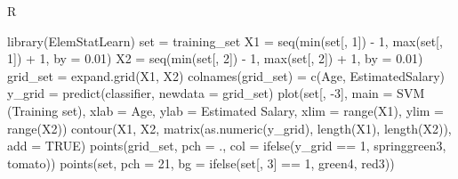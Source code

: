 \documentclass[
]{book}
\newenvironment{Shaded}{\begin{snugshade}}{\end{snugshade}}
\newcommand{\AttributeTok}[1]{\textcolor[rgb]{0.77,0.63,0.00}{#1}}
\newcommand{\ConstantTok}[1]{\textcolor[rgb]{0.00,0.00,0.00}{#1}}
\newcommand{\DecValTok}[1]{\textcolor[rgb]{0.00,0.00,0.81}{#1}}
\newcommand{\FloatTok}[1]{\textcolor[rgb]{0.00,0.00,0.81}{#1}}
\newcommand{\FunctionTok}[1]{\textcolor[rgb]{0.00,0.00,0.00}{#1}}
\newcommand{\NormalTok}[1]{#1}
\newcommand{\OtherTok}[1]{\textcolor[rgb]{0.56,0.35,0.01}{#1}}
\newcommand{\SpecialCharTok}[1]{\textcolor[rgb]{0.00,0.00,0.00}{#1}}
\newcommand{\StringTok}[1]{\textcolor[rgb]{0.31,0.60,0.02}{#1}}
\theoremstyle{definition}
\theoremstyle{definition}
\theoremstyle{definition}
\theoremstyle{definition}
\theoremstyle{remark}
\begin{document}
R

\begin{Shaded}
\begin{Highlighting}[]
\FunctionTok{library}\NormalTok{(ElemStatLearn)}
\NormalTok{set }\OtherTok{=}\NormalTok{ training\_set}
\NormalTok{X1 }\OtherTok{=} \FunctionTok{seq}\NormalTok{(}\FunctionTok{min}\NormalTok{(set[, }\DecValTok{1}\NormalTok{]) }\SpecialCharTok{{-}} \DecValTok{1}\NormalTok{, }\FunctionTok{max}\NormalTok{(set[, }\DecValTok{1}\NormalTok{]) }\SpecialCharTok{+} \DecValTok{1}\NormalTok{, }\AttributeTok{by =} \FloatTok{0.01}\NormalTok{)}
\NormalTok{X2 }\OtherTok{=} \FunctionTok{seq}\NormalTok{(}\FunctionTok{min}\NormalTok{(set[, }\DecValTok{2}\NormalTok{]) }\SpecialCharTok{{-}} \DecValTok{1}\NormalTok{, }\FunctionTok{max}\NormalTok{(set[, }\DecValTok{2}\NormalTok{]) }\SpecialCharTok{+} \DecValTok{1}\NormalTok{, }\AttributeTok{by =} \FloatTok{0.01}\NormalTok{)}
\NormalTok{grid\_set }\OtherTok{=} \FunctionTok{expand.grid}\NormalTok{(X1, X2)}
\FunctionTok{colnames}\NormalTok{(grid\_set) }\OtherTok{=} \FunctionTok{c}\NormalTok{(}\StringTok{\textquotesingle{}Age\textquotesingle{}}\NormalTok{, }\StringTok{\textquotesingle{}EstimatedSalary\textquotesingle{}}\NormalTok{)}
\NormalTok{y\_grid }\OtherTok{=} \FunctionTok{predict}\NormalTok{(classifier, }\AttributeTok{newdata =}\NormalTok{ grid\_set)}
\FunctionTok{plot}\NormalTok{(set[, }\SpecialCharTok{{-}}\DecValTok{3}\NormalTok{],}
     \AttributeTok{main =} \StringTok{\textquotesingle{}SVM (Training set)\textquotesingle{}}\NormalTok{,}
     \AttributeTok{xlab =} \StringTok{\textquotesingle{}Age\textquotesingle{}}\NormalTok{, }\AttributeTok{ylab =} \StringTok{\textquotesingle{}Estimated Salary\textquotesingle{}}\NormalTok{,}
     \AttributeTok{xlim =} \FunctionTok{range}\NormalTok{(X1), }\AttributeTok{ylim =} \FunctionTok{range}\NormalTok{(X2))}
\FunctionTok{contour}\NormalTok{(X1, X2, }\FunctionTok{matrix}\NormalTok{(}\FunctionTok{as.numeric}\NormalTok{(y\_grid), }\FunctionTok{length}\NormalTok{(X1), }\FunctionTok{length}\NormalTok{(X2)), }\AttributeTok{add =} \ConstantTok{TRUE}\NormalTok{)}
\FunctionTok{points}\NormalTok{(grid\_set, }\AttributeTok{pch =} \StringTok{\textquotesingle{}.\textquotesingle{}}\NormalTok{, }\AttributeTok{col =} \FunctionTok{ifelse}\NormalTok{(y\_grid }\SpecialCharTok{==} \DecValTok{1}\NormalTok{, }\StringTok{\textquotesingle{}springgreen3\textquotesingle{}}\NormalTok{, }\StringTok{\textquotesingle{}tomato\textquotesingle{}}\NormalTok{))}
\FunctionTok{points}\NormalTok{(set, }\AttributeTok{pch =} \DecValTok{21}\NormalTok{, }\AttributeTok{bg =} \FunctionTok{ifelse}\NormalTok{(set[, }\DecValTok{3}\NormalTok{] }\SpecialCharTok{==} \DecValTok{1}\NormalTok{, }\StringTok{\textquotesingle{}green4\textquotesingle{}}\NormalTok{, }\StringTok{\textquotesingle{}red3\textquotesingle{}}\NormalTok{))}
\end{Highlighting}
\end{Shaded}
\end{document}
